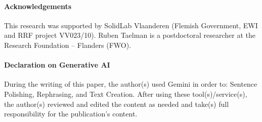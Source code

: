 \documentclass{ceurart}
\theoremstyle{definition}
\begin{document}
\paragraph{Acknowledgements} This research was supported by SolidLab Vlaanderen (Flemish Government, EWI and RRF project VV023/10).
Ruben Taelman is a postdoctoral researcher at the Research Foundation – Flanders (FWO).
\paragraph{Declaration on Generative AI} During the writing of this paper, the author(s) used Gemini in order to: Sentence Polishing, Rephrasing, and Text Creation. After using these tool(s)/service(s), the author(s) reviewed and edited the content as needed and take(s) full responsibility for the publication’s content.


\end{document}

